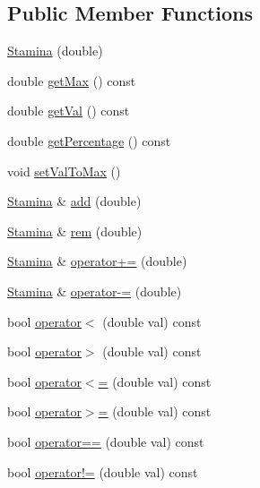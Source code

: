 \subsection*{Public Member Functions}
\begin{DoxyCompactItemize}
\item 
\hyperlink{classStamina_a90296cdf856dfd26d661c0bb57b02108_a90296cdf856dfd26d661c0bb57b02108}{Stamina} (double)
\item 
double \hyperlink{classStamina_a2058ea4b530bc666a7ac69fc4549c9fc_a2058ea4b530bc666a7ac69fc4549c9fc}{get\+Max} () const
\item 
double \hyperlink{classStamina_a57bbd8b3071fe52521ddfb084a2c2694_a57bbd8b3071fe52521ddfb084a2c2694}{get\+Val} () const
\item 
double \hyperlink{classStamina_ae828f2e015de23a14150769c0b6c91a6_ae828f2e015de23a14150769c0b6c91a6}{get\+Percentage} () const
\item 
void \hyperlink{classStamina_a8047f55489de6d5101d0c4d1c4ff49b9_a8047f55489de6d5101d0c4d1c4ff49b9}{set\+Val\+To\+Max} ()
\item 
\hyperlink{classStamina}{Stamina} \& \hyperlink{classStamina_afc204ffdbeb2696f031dc68a08c7330c_afc204ffdbeb2696f031dc68a08c7330c}{add} (double)
\item 
\hyperlink{classStamina}{Stamina} \& \hyperlink{classStamina_a54413ab56d9d0782b588eac64ee0bbe0_a54413ab56d9d0782b588eac64ee0bbe0}{rem} (double)
\item 
\hyperlink{classStamina}{Stamina} \& \hyperlink{classStamina_ac6c546b319bdeb9c82f83a0aa87b2894_ac6c546b319bdeb9c82f83a0aa87b2894}{operator+=} (double)
\item 
\hyperlink{classStamina}{Stamina} \& \hyperlink{classStamina_afa57a14ac8fe63c95b9cc1a8ebd66945_afa57a14ac8fe63c95b9cc1a8ebd66945}{operator-\/=} (double)
\item 
bool \hyperlink{classStamina_a4958bdadaf27115a1d458fc94939390a_a4958bdadaf27115a1d458fc94939390a}{operator$<$} (double val) const
\item 
bool \hyperlink{classStamina_aecb929dd6ebe322e92d714fd585413a8_aecb929dd6ebe322e92d714fd585413a8}{operator$>$} (double val) const
\item 
bool \hyperlink{classStamina_a6bdebd03a3310fb1017661c0997484a0_a6bdebd03a3310fb1017661c0997484a0}{operator$<$=} (double val) const
\item 
bool \hyperlink{classStamina_ae0b3f0fe7e80ecaa3e3dcacaa98f79e1_ae0b3f0fe7e80ecaa3e3dcacaa98f79e1}{operator$>$=} (double val) const
\item 
bool \hyperlink{classStamina_aa3067e0326a250c295cfdba2eeb8f8b6_aa3067e0326a250c295cfdba2eeb8f8b6}{operator==} (double val) const
\item 
bool \hyperlink{classStamina_aa8bbeed4d64bf1645b3eeb544bdd2c6a_aa8bbeed4d64bf1645b3eeb544bdd2c6a}{operator!=} (double val) const
\end{DoxyCompactItemize}
